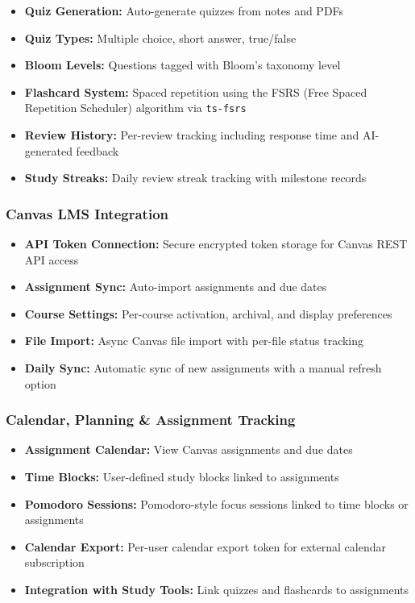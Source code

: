\documentclass[12pt,a4paper]{article}
\begin{document}
\begin{itemize}
    \item \textbf{Quiz Generation:} Auto-generate quizzes from notes and PDFs
    \item \textbf{Quiz Types:} Multiple choice, short answer, true/false
    \item \textbf{Bloom Levels:} Questions tagged with Bloom's taxonomy level
    \item \textbf{Flashcard System:} Spaced repetition using the FSRS (Free Spaced Repetition Scheduler) algorithm via \texttt{ts-fsrs}
    \item \textbf{Review History:} Per-review tracking including response time and AI-generated feedback
    \item \textbf{Study Streaks:} Daily review streak tracking with milestone records
\end{itemize}

\subsubsection{Canvas LMS Integration}

\begin{itemize}
    \item \textbf{API Token Connection:} Secure encrypted token storage for Canvas REST API access
    \item \textbf{Assignment Sync:} Auto-import assignments and due dates
    \item \textbf{Course Settings:} Per-course activation, archival, and display preferences
    \item \textbf{File Import:} Async Canvas file import with per-file status tracking
    \item \textbf{Daily Sync:} Automatic sync of new assignments with a manual refresh option
\end{itemize}

\subsubsection{Calendar, Planning \& Assignment Tracking}

\begin{itemize}
    \item \textbf{Assignment Calendar:} View Canvas assignments and due dates
    \item \textbf{Time Blocks:} User-defined study blocks linked to assignments
    \item \textbf{Pomodoro Sessions:} Pomodoro-style focus sessions linked to time blocks or assignments
    \item \textbf{Calendar Export:} Per-user calendar export token for external calendar subscription
    \item \textbf{Integration with Study Tools:} Link quizzes and flashcards to assignments
\end{itemize}
\end{document}
